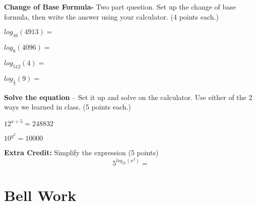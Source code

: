 \documentclass[12pt]{article}
\begin{document}
\textbf{Change of Base Formula-} Two part question. Set up the change of base formula, then write the answer using your calculator. (4 points each.)\\

\begin{enumerate}[resume]
\begin{multicols}{2}
	\setlength\itemsep{2cm}
	
	\item $log_{16}(4913)=$\\
	
	\item $log_{8}(4096)=$\\
	
	\item $log_{512}(4)=$\\
	
	\item $log_{\frac{1}{3}}(9)=$\\


\end{multicols}
\end{enumerate}

\textbf{Solve the equation} -- Set it up and solve on the calculator. Use either of the 2 ways we learned in class. (5 points each.)\\

\begin{enumerate}[resume]
\begin{multicols}{2}
	\setlength\itemsep{2cm}
	

	\item $12^{x+5}=248832$\\
	
	\item $10^{y^2}=10000$\\
	


\end{multicols}
\end{enumerate}

\vspace{1in}


\hrulefill

\textbf{Extra Credit:} Simplify the expression (5 points) $$5^{log_{25}(x^2)}=$$

\section{Bell Work}
\end{document}
